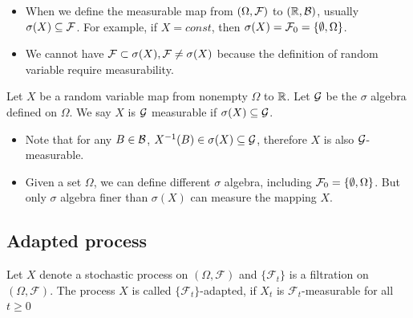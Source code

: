 \begin{refsection}
\begin{remark}[interpretation]\hfill
\begin{itemize}
	\item When we define the measurable map from $(\Omega,\mathcal{F})$ to $(\mathbb{R},\mathcal{B})$,	
	usually $\sigma(X) \subseteq \mathcal{F}$. For example, if $X = const$, then $\sigma(X) = \mathcal{F}_0 = \{\emptyset,\Omega \}$. 
	\item We cannot have $\mathcal{F}\subset \sigma(X), \mathcal{F}\neq \sigma(X)$ because the definition of random variable require measurability.
\end{itemize}	
	
\end{remark}



\begin{definition}\cite[53]{shreve2004stochastic2}
	Let $X$ be a random variable map from nonempty $\Omega$ to $\mathbb{R}$. Let $\mathcal{G}$ be the $\sigma$ algebra defined on $\Omega$.
	We say $X$ is $\mathcal{G}$ measurable if $\sigma(X) \subseteq \mathcal{G}$.
\end{definition}

\begin{remark}[interpretation]\hfill
\begin{itemize}
	\item Note that for any $B\in \mathcal{B}$, $X^{-1}(B) \in \sigma(X) \subseteq \mathcal{G}$, therefore $X$ is also $\mathcal{G}$-measurable.
	\item Given a set $\Omega$, we can define different $\sigma$ algebra, including $\mathcal{F}_0=\{\emptyset,\Omega\}$. But only $\sigma$ algebra finer than $\sigma(X)$ can measure the mapping $X$.
\end{itemize}	
\end{remark}



\subsection{Adapted process}
\begin{definition}
	Let $X$ denote a stochastic process on $(\Omega,\mathcal{F})$ and $\{\mathcal{F}_t\}$ is a filtration on $(\Omega,\mathcal{F})$. The process $X$ is called $\{\mathcal{F}_t\}$-adapted, if $X_t$ is $\mathcal{F}_t$-measurable for all $t\geq 0$
\end{definition}



\end{refsection}
